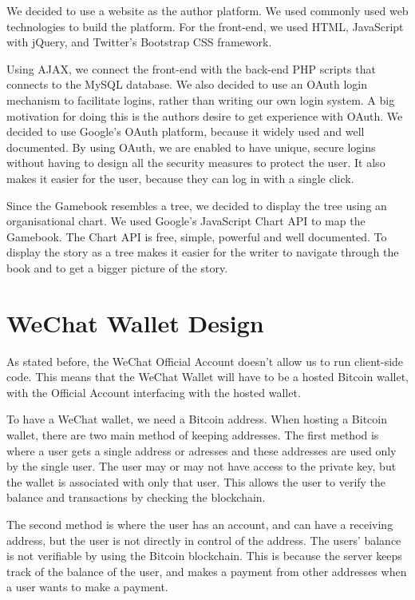 We decided to use a website as the author platform. We used commonly used web technologies to build the platform. For the front-end, we used HTML, JavaScript with jQuery, and Twitter's Bootstrap CSS framework.

Using AJAX, we connect the front-end with the back-end PHP scripts that connects to the MySQL database. We also decided to use an OAuth login mechanism to facilitate logins, rather than writing our own login system. A big motivation for doing this is the authors desire to get experience with OAuth. We decided to use Google's OAuth platform, because it widely used and well documented. By using OAuth, we are enabled to have unique, secure logins without having to design all the security measures to protect the user. It also makes it easier for the user, because they can log in with a single click.

Since the Gamebook resembles a tree, we decided to display the tree using an organisational chart. We used Google's JavaScript Chart API to map the Gamebook. The Chart API is free, simple, powerful and well documented. To display the story as a tree makes it easier for the writer to navigate through the book and to get a bigger picture of the story.


\section{WeChat Wallet Design}
\label{sct:wechat_wallet_design}

As stated before, the WeChat Official Account doesn't allow us to run client-side code. This means that the WeChat Wallet will have to be a hosted Bitcoin wallet, with the Official Account interfacing with the hosted wallet.

To have a WeChat wallet, we need a Bitcoin address. When hosting a Bitcoin wallet, there are two main method of keeping addresses. The first method is where a user gets a single address or adresses and these addresses are used only by the single user. The user may or may not have access to the private key, but the wallet is associated with only that user. This allows the user to verify the balance and transactions by checking the blockchain. 

The second method is where the user has an account, and can have a receiving address, but the user is not directly in control of the address. The users' balance is not verifiable by using the Bitcoin blockchain. This is because the server keeps track of the balance of the user, and makes a payment from other addresses when a user wants to make a payment.

